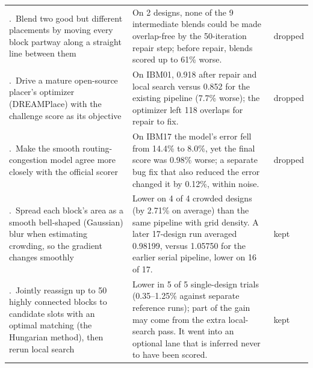 \begin{table}[htbp]
\begin{tabularx}{\linewidth}{@{}>{\raggedright\arraybackslash\hsize=0.9\hsize}X>{\raggedright\arraybackslash\hsize=1.1\hsize}Xl@{}}
\addlinespace[2pt]
6.~Blend two good but different placements by moving every block partway along a straight line between them & On 2 designs, none of the 9 intermediate blends could be made overlap-free by the 50-iteration repair step; before repair, blends scored up to 61\% worse. & dropped \\
\addlinespace[2pt]
7.~Drive a mature open-source placer's optimizer (DREAMPlace) with the challenge score as its objective & On IBM01, 0.918 after repair and local search versus 0.852 for the existing pipeline (7.7\% worse); the optimizer left 118 overlaps for repair to fix. & dropped \\
\addlinespace[2pt]
8.~Make the smooth routing-congestion model agree more closely with the official scorer & On IBM17 the model's error fell from 14.4\% to 8.0\%, yet the final score was 0.98\% worse; a separate bug fix that also reduced the error changed it by 0.12\%, within noise. & dropped \\
\addlinespace[2pt]
9.~Spread each block's area as a smooth bell-shaped (Gaussian) blur when estimating crowding, so the gradient changes smoothly & Lower on 4 of 4 crowded designs (by 2.71\% on average) than the same pipeline with grid density. A later 17-design run averaged 0.98199, versus 1.05750 for the earlier serial pipeline, lower on 16 of 17. & kept \\
\addlinespace[2pt]
10.~Jointly reassign up to 50 highly connected blocks to candidate slots with an optimal matching (the Hungarian method), then rerun local search & Lower in 5 of 5 single-design trials (0.35--1.25\% against separate reference runs); part of the gain may come from the extra local-search pass. It went into an optional lane that is inferred never to have been scored. & kept \\
\bottomrule
\end{tabularx}
\end{table}
